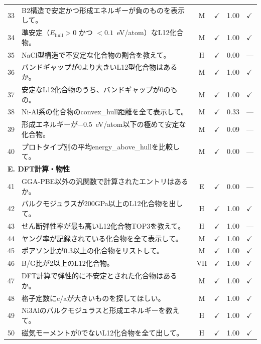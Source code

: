\documentclass[5p,twocolumn]{elsarticle}
\begin{document}
\begin{longtable}{clcccl}
    33 & B2構造で安定かつ形成エネルギーが負のものを表示して。 & M & $\checkmark$ & 1.00 & $\checkmark$ \\
    34 & 準安定（$E_\text{hull} > 0$ かつ $< 0.1$~eV/atom）なL12化合物。 & M & $\checkmark$ & 1.00 & $\checkmark$ \\
    35 & NaCl型構造で不安定な化合物の割合を教えて。 & H & $\checkmark$ & 0.00 & --- \\
    36 & バンドギャップが0より大きいL12型化合物はあるか。 & M & $\checkmark$ & 1.00 & $\checkmark$ \\
    37 & 安定なL12化合物のうち、バンドギャップが0のもの。 & M & $\checkmark$ & 1.00 & $\checkmark$\\
    38 & Ni-Al系の化合物のconvex\_hull距離を全て表示して。 & M & $\checkmark$ & 0.33 & ---\\
    39 & 形成エネルギーが$-0.5$~eV/atom以下の極めて安定な化合物。 & M & $\checkmark$ & 0.09 & ---\\
    40 & プロトタイプ別の平均energy\_above\_hullを比較して。 & M & $\checkmark$ & 0.00 & --- \\
    \midrule
    \multicolumn{6}{l}{\textbf{E. DFT計算・物性}} \\
    \midrule
    41 & GGA-PBE以外の汎関数で計算されたエントリはあるか。 & E & $\checkmark$ & 0.00 & --- \\
    42 & バルクモジュラスが200GPa以上のL12化合物を出して。 & H & $\checkmark$ & 1.00 & $\checkmark$ \\
    43 & せん断弾性率が最も高いL12化合物TOP3を教えて。 & H & $\checkmark$ & 1.00 & ---\\
    44 & ヤング率が記録されている化合物を全て表示して。 & M & $\checkmark$ & 1.00 & $\checkmark$ \\
    45 & ポアソン比が0.3以上の化合物をリストして。 & M & $\checkmark$ & 1.00 & $\checkmark$ \\
    46 & B/G比が2以上のL12化合物。 & VH & $\checkmark$ & 1.00 & $\checkmark$ \\
    47 & DFT計算で弾性的に不安定とされた化合物はあるか。 & M & $\checkmark$ & 1.00 & $\checkmark$ \\
    48 & 格子定数にc/aが大きいものを探してほしい。 & M & $\checkmark$ & 1.00 & $\checkmark$ \\
    49 & Ni3Alのバルクモジュラスと形成エネルギーを教えて。 & H & $\checkmark$ & 1.00 & $\checkmark$ \\
    50 & 磁気モーメントが0でないL12化合物を全て出して。 & H & $\checkmark$ & 1.00 & $\checkmark$ \\

\end{longtable}
\end{document}
